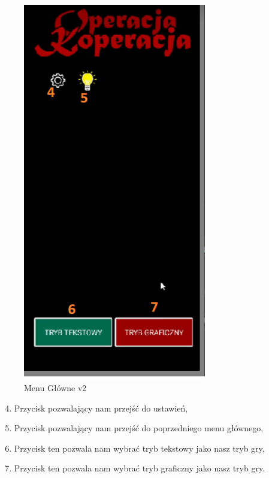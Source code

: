 	\begin{figure}[!htb]
	\begin{center}
		\includegraphics[width=8cm]{rys/opis3.png}
		\caption{Menu Główne v2}
		\label{rys:rysunek001}
	\end{center}
\end{figure}


\begin{enumerate}
	\setcounter{enumi}{3}
	\item Przycisk pozwalający nam przejść do ustawień, 
	\item Przycisk pozwalający nam przejść do poprzedniego menu głównego,
	\item Przycisk ten pozwala nam wybrać tryb tekstowy jako nasz tryb gry,
	\item Przycisk ten pozwala nam wybrać tryb graficzny jako nasz tryb gry.
\end{enumerate}

